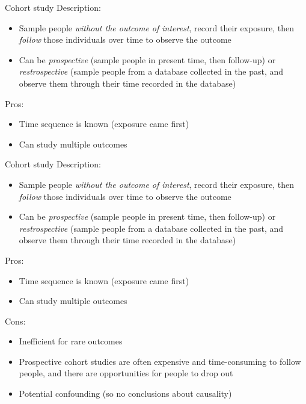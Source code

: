 \documentclass[10pt,t]{beamer}
\begin{document}
\begin{frame}{Cohort study}
Description:
\begin{itemize}
	\item Sample people \textit{without the outcome of interest}, record their exposure, then \textit{follow} those individuals over time to observe the outcome
	\item Can be \textit{prospective} (sample people in present time, then follow-up) or \textit{restrospective} (sample people from a database collected in the past, and observe them through their time recorded in the database)
\end{itemize}
Pros:
\begin{itemize}
	\item Time sequence is known (exposure came first)
	\item Can study multiple outcomes 
\end{itemize}
\end{frame}

\begin{frame}{Cohort study}
Description:
\begin{itemize}
	\item Sample people \textit{without the outcome of interest}, record their exposure, then \textit{follow} those individuals over time to observe the outcome
	\item Can be \textit{prospective} (sample people in present time, then follow-up) or \textit{restrospective} (sample people from a database collected in the past, and observe them through their time recorded in the database)
\end{itemize}
Pros:
\begin{itemize}
	\item Time sequence is known (exposure came first)
	\item Can study multiple outcomes 
\end{itemize}
Cons:
\begin{itemize}
	\item Inefficient for rare outcomes
	\item Prospective cohort studies are often expensive and time-consuming to follow people, and there are opportunities for people to drop out
	\item Potential confounding (so no conclusions about causality)
\end{itemize}
\end{frame}
\end{document}
